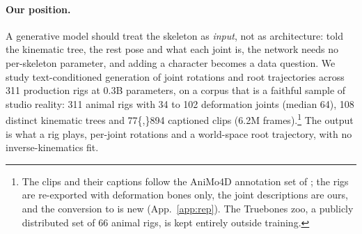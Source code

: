 \paragraph{Our position.} A generative model should treat the skeleton as \emph{input}, not as
architecture: told the kinematic tree, the rest pose and what each joint is, the network needs no
per-skeleton parameter, and adding a character becomes a data question. We study text-conditioned
generation of joint rotations and root trajectories across \num{311} production rigs at 0.3B parameters, on a
corpus that is a faithful sample of studio reality: \num{311} animal rigs with \num{34} to \num{102}
deformation joints (median 64), \num{108} distinct kinematic trees and \num{77{,}894} captioned clips
(\num{6.2}M frames).\footnote{The clips and their captions follow the AniMo4D annotation set of
\citet{wang2025animo}; the rigs are re-exported with deformation bones only, the joint descriptions are ours,
and the conversion to \rep{} is new (App.~\ref{app:rep}). The Truebones zoo, a publicly distributed set of 66
animal rigs, is kept entirely outside training.} The output is what a rig plays, per-joint rotations and a
world-space root trajectory, with no inverse-kinematics fit.

